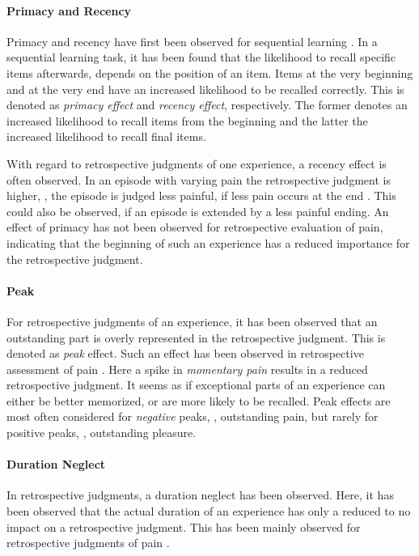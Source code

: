 \paragraph*{Primacy and Recency}
Primacy and recency have first been observed for sequential learning \citep[][]{murdock_jr._serial_1962}.
In a sequential learning task, it has been found that the likelihood to recall specific items afterwards, depends on the position of an item.
Items at the very beginning and at the very end have an increased likelihood to be recalled correctly.
This is denoted as \emph{primacy effect} and \emph{recency effect}, respectively.
The former denotes an increased likelihood to recall items from the beginning and the latter the increased likelihood to recall final items.

With regard to retrospective judgments of one experience, a recency effect is often observed.
In an episode with varying pain the retrospective judgment is higher, \ie, the episode is judged less painful, if less pain occurs at the end \citep[][]{kahneman_when_1993, redelmeier_patients_1996}.
This could also be observed, if an episode is extended by a less painful ending.
An effect of primacy has not been observed for retrospective evaluation of pain, indicating that the beginning of such an experience has a reduced importance for the retrospective judgment.

\paragraph*{Peak}
For retrospective judgments of an experience, it has been observed that an outstanding part is overly represented in the retrospective judgment.
This is denoted as \emph{peak} effect.
Such an effect has been observed in retrospective assessment of pain \citep[][]{kahneman_when_1993, redelmeier_patients_1996}.
Here a spike in \emph{momentary pain} results in a reduced retrospective judgment.
It seems as if exceptional parts of an experience can either be better memorized, or are more likely to be recalled.
Peak effects are most often considered for \emph{negative} peaks, \eg, outstanding pain, but rarely for positive peaks, \eg, outstanding pleasure.

\paragraph*{Duration Neglect}
In retrospective judgments, a duration neglect has been observed.
Here, it has been observed that the actual duration of an experience has only a reduced to no impact on a retrospective judgment.
This has been mainly observed for retrospective judgments of pain \citep[][]{fredrickson_duration_1993, ariely_combining_1998}.


